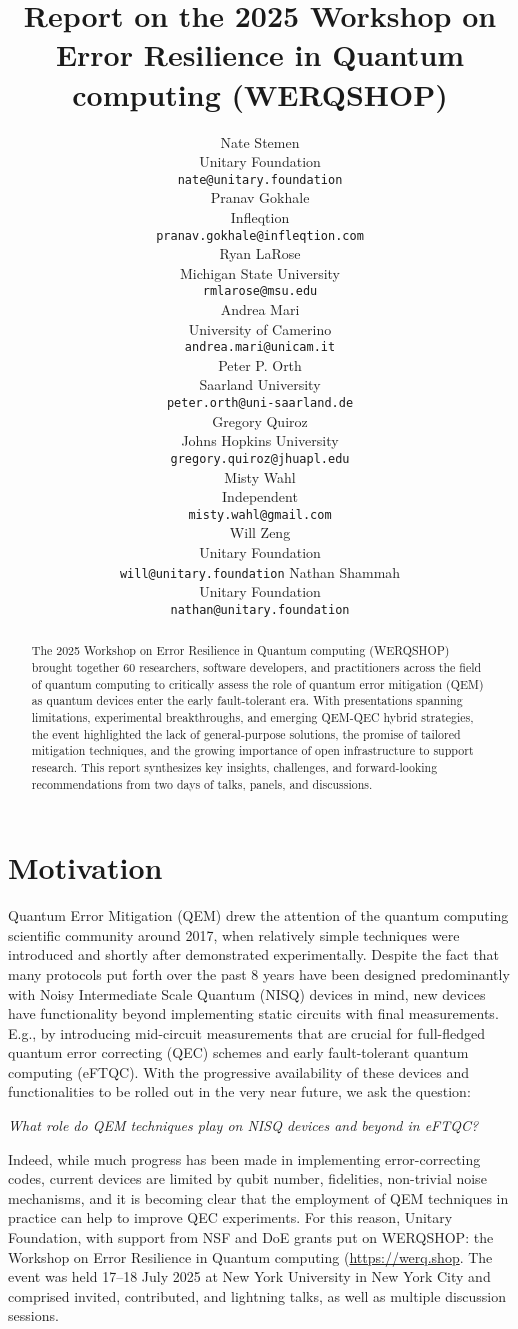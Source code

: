 \documentclass{article}
\title{Report on the 2025 Workshop on Error Resilience in Quantum computing (WERQSHOP)}
\author{
 Nate Stemen \\
  Unitary Foundation\\
  \texttt{nate@unitary.foundation}\\
   \And
 Pranav Gokhale \\
   Infleqtion\\
   \texttt{pranav.gokhale@infleqtion.com}\\  
\And Ryan LaRose \\
  Michigan State University\\
  \texttt{rmlarose@msu.edu}\\
  \And
 Andrea Mari \\
   University of Camerino\\
   \texttt{andrea.mari@unicam.it}\\
   \And
 Peter P. Orth \\
  Saarland University\\
  \texttt{peter.orth@uni-saarland.de}\\
  \And
  \And
 Gregory Quiroz \\
  Johns Hopkins University \\
  \texttt{gregory.quiroz@jhuapl.edu} \\
  \And
 Misty Wahl\\
  Independent\\
  \texttt{misty.wahl@gmail.com}\\
  \And
 Will Zeng\\
  Unitary Foundation\\
  \texttt{will@unitary.foundation}
     \And
 Nathan Shammah \\
  Unitary Foundation\\
  \texttt{nathan@unitary.foundation}\\
}
\begin{document}
\maketitle
\begin{abstract}
The 2025 Workshop on Error Resilience in Quantum computing (WERQSHOP) brought together 60 researchers, software developers, and practitioners across the field of quantum computing to critically assess the role of quantum error mitigation (QEM) as quantum devices enter the early fault-tolerant era.
With presentations spanning limitations, experimental breakthroughs, and emerging QEM-QEC hybrid strategies, the event highlighted the lack of general-purpose solutions, the promise of tailored mitigation techniques, and the growing importance of open infrastructure to support research.
This report synthesizes key insights, challenges, and forward-looking recommendations from two days of talks, panels, and discussions.
\end{abstract}




\section{Motivation}\label{sec:motivation}

Quantum Error Mitigation (QEM) drew the attention of the quantum computing scientific community  around 2017, when relatively simple techniques were introduced \cite{ZNEintro,ZNEPECintro} and shortly after demonstrated experimentally.
Despite the fact that many protocols put forth over the past 8 years have been designed predominantly with Noisy Intermediate Scale Quantum (NISQ) devices in mind, new devices have functionality beyond implementing static circuits with final measurements. E.g., by introducing mid-circuit measurements that are crucial for full-fledged quantum error correcting (QEC) schemes and early fault-tolerant quantum computing (eFTQC).
With the progressive availability of these devices and functionalities to be rolled out in the very near future, we ask the question:

\begin{displayquote}
\emph{What role do QEM techniques play on NISQ devices and beyond in eFTQC?}
\end{displayquote}

Indeed, while much progress has been made in implementing error-correcting codes, current devices are limited by qubit number, fidelities, non-trivial noise mechanisms, and it is becoming clear that the employment of QEM techniques in practice can help to improve QEC experiments.
For this reason, Unitary Foundation, with support from NSF and DoE grants put on WERQSHOP: the Workshop on Error Resilience in Quantum computing (\url{https://werq.shop}.
The event was held 17--18 July 2025 at New York University in New York City and comprised invited, contributed, and lightning talks, as well as multiple discussion sessions.
\end{document}
